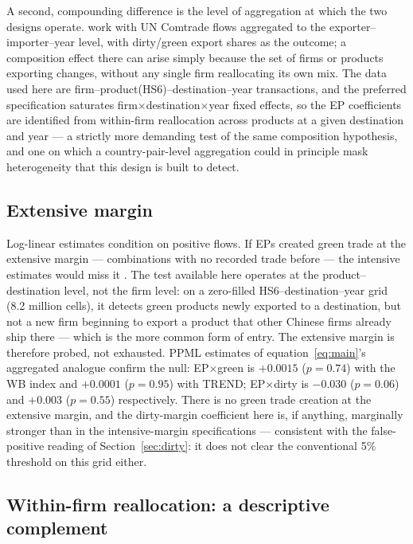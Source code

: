 \documentclass[12pt]{article}
\begin{document}
A second, compounding difference is the level of aggregation at which the two designs
operate. \citet{brandi2020} work with UN Comtrade flows aggregated to the
exporter--importer--year level, with dirty/green export shares as the outcome; a
composition effect there can arise simply because the set of firms or products exporting
changes, without any single firm reallocating its own mix. The data used here are
firm--product(HS6)--destination--year transactions, and the preferred specification
saturates firm$\times$destination$\times$year fixed effects, so the EP coefficients are
identified from within-firm reallocation across products at a given destination and year
--- a strictly more demanding test of the same composition hypothesis, and one on which a
country-pair-level aggregation could in principle mask heterogeneity that this design is
built to detect.

\subsection{Extensive margin}

Log-linear estimates condition on positive flows. If EPs created green trade at the
extensive margin --- combinations with no recorded trade before --- the intensive
estimates would miss it \citep{santossilva2006, larch2025}. The test available here
operates at the product--destination level, not the firm level: on a zero-filled
HS6--destination--year grid (8.2 million cells), it detects green products newly exported
to a destination, but not a new firm beginning to export a product that other Chinese
firms already ship there --- which is the more common form of entry. The extensive margin
is therefore probed, not exhausted. PPML estimates of
equation~\eqref{eq:main}'s aggregated analogue confirm the null: EP$\times$green is
$+0.0015$ ($p=0.74$) with the WB index and $+0.0001$ ($p=0.95$) with TREND;
EP$\times$dirty is $-0.030$ ($p=0.06$) and $+0.003$ ($p=0.55$) respectively. There is
no green trade creation at the extensive margin, and the dirty-margin coefficient here
is, if anything, marginally stronger than in the intensive-margin specifications ---
consistent with the false-positive reading of Section~\ref{sec:dirty}: it does not clear
the conventional 5\% threshold on this grid either.

\subsection{Within-firm reallocation: a descriptive complement}
\end{document}
